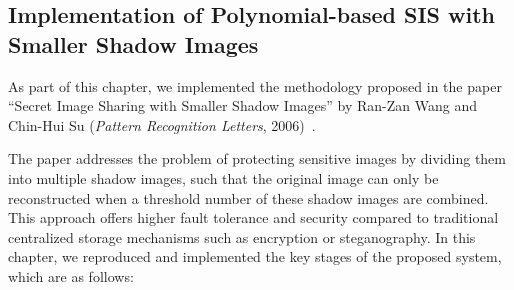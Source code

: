 \subsection{Implementation of Polynomial-based SIS with Smaller Shadow Images}
 
As part of this chapter, we implemented the methodology proposed in the paper ``Secret Image Sharing with Smaller Shadow Images'' by Ran-Zan Wang and Chin-Hui Su (\textit{Pattern Recognition Letters}, 2006)~\cite{wang2006secret}.
 
The paper addresses the problem of protecting sensitive images by dividing them into multiple shadow images, such that the original image can only be reconstructed when a threshold number of these shadow images are combined. This approach offers higher fault tolerance and security compared to traditional centralized storage mechanisms such as encryption or steganography. In this chapter, we reproduced and implemented the key stages of the proposed system, which are as follows:
 

